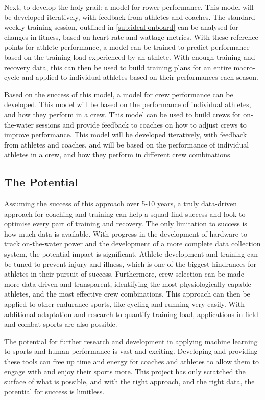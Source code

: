 Next, to develop the holy grail: a model for rower performance. This model will be developed iteratively, with feedback from athletes and coaches. The standard weekly training session, outlined in \autoref{sub:ideal-onboard} can be analysed for changes in fitness, based on heart rate and wattage metrics. With these reference points for athlete performance, a model can be trained to predict performance based on the training load experienced by an athlete. With enough training and recovery data, this can then be used to build training plans for an entire macro-cycle and applied to individual athletes based on their performances each season. 

Based on the success of this model, a model for crew performance can be developed. This model will be based on the performance of individual athletes, and how they perform in a crew. This model can be used to build crews for on-the-water sessions and provide feedback to coaches on how to adjust crews to improve performance. This model will be developed iteratively, with feedback from athletes and coaches, and will be based on the performance of individual athletes in a crew, and how they perform in different crew combinations.

\subsection{The Potential}
Assuming the success of this approach over 5-10 years, a truly data-driven approach for coaching and training can help a squad find success and look to optimise every part of training and recovery. The only limitation to success is how much data is available. With progress in the development of hardware to track on-the-water power and the development of a more complete data collection system, the potential impact is significant. Athlete development and training can be tuned to prevent injury and illness, which is one of the biggest hindrances for athletes in their pursuit of success. Furthermore, crew selection can be made more data-driven and transparent, identifying the most physiologically capable athletes, and the most effective crew combinations. This approach can then be applied to other endurance sports, like cycling and running very easily. With additional adaptation and research to quantify training load, applications in field and combat sports are also possible.

The potential for further research and development in applying machine learning to sports and human performance is vast and exciting. Developing and providing these tools can free up time and energy for coaches and athletes to allow them to engage with and enjoy their sports more. This project has only scratched the surface of what is possible, and with the right approach, and the right data, the potential for success is limitless.

